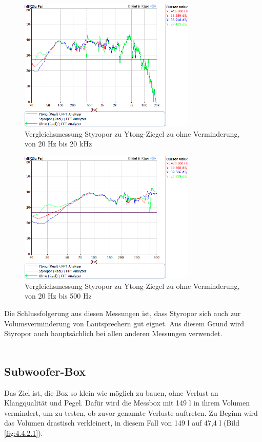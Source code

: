 \begin{figure} [H]
	\centering
	\includegraphics[width=0.75\textwidth]{img/Optimierung/Vergleich/VergleichYtognStyroOhne_full.png}
	\caption{Vergleichsmessung Styropor zu Ytong-Ziegel zu ohne Verminderung, von 20 Hz bis 20 kHz}
	\label{fig:4.4.1.5}
\end{figure}\begin{figure} [H]
	\centering
	\includegraphics[width=0.75\textwidth]{img/Optimierung/Vergleich/VergleichYtognStyroOhne_500Hz.png}
	\caption{Vergleichsmessung Styropor zu Ytong-Ziegel zu ohne Verminderung, von 20 Hz bis 500 Hz}
	\label{fig:4.4.1.6}
\end{figure}

Die Schlussfolgerung aus diesen Messungen ist, dass Styropor sich auch zur Volumsverminderung von Lautsprechern gut eignet.
Aus diesem Grund wird Styropor auch hauptsächlich bei allen anderen Messungen verwendet.
\\ \\




\subsection{Subwoofer-Box}\label{subsec:4.4.2}
Das Ziel ist, die Box so klein wie möglich zu bauen, ohne Verlust an Klangqualität und Pegel.
Dafür wird die Messbox mit 149 l in ihrem Volumen vermindert, um zu testen, ob zuvor genannte Verluste auftreten.
Zu Beginn wird das Volumen drastisch verkleinert, in diesem Fall von 149 l auf 47,4 l (Bild \ref{fig:4.4.2.1}).

